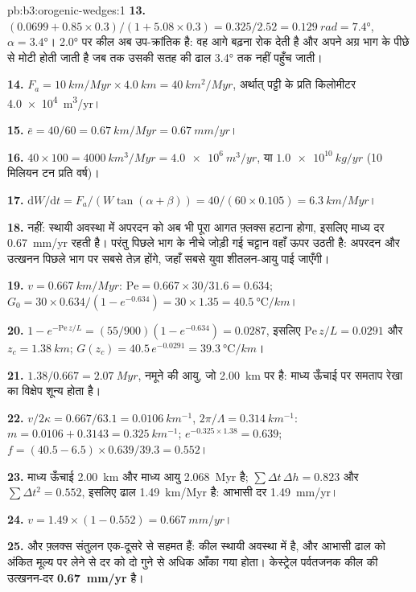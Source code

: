 \begin{solution}{pb:b3:orogenic-wedges:1}
\textbf{13.} $(0.0699 + 0.85\times0.3)/(1 + 5.08\times0.3) = 0.325/2.52 =
\qty{0.129}{rad} = \ang{7.4}$, $\alpha = \ang{3.4}$। \ang{2.0} पर कील
अब उप-क्रांतिक है: वह आगे बढ़ना रोक देती है और अपने अग्र भाग के पीछे
 से मोटी होती जाती है जब तक उसकी सतह की ढाल \ang{3.4} तक नहीं पहुँच जाती।

\textbf{14.} $F_a = \qty{10}{km/Myr}\times\qty{4.0}{km} = \qty{40}{km^2/Myr}$,
अर्थात् पट्टी के प्रति किलोमीटर \qty{4.0e4}{m^3/yr}।

\textbf{15.} $\bar e = 40/60 = \qty{0.67}{km/Myr} = \qty{0.67}{mm/yr}$।

\textbf{16.} $40\times100 = \qty{4000}{km^3/Myr} = \qty{4.0e6}{m^3/yr}$, या
$\qty{1.0e10}{kg/yr}$ (10 मिलियन टन प्रति वर्ष)।

\textbf{17.} $\mathrm dW/\mathrm dt = F_a/(W\tan(\alpha + \beta)) =
40/(60\times0.105) = \qty{6.3}{km/Myr}$।

\textbf{18.} नहीं: स्थायी अवस्था में अपरदन को अब भी पूरा आगत फ़्लक्स
हटाना होगा, इसलिए माध्य दर \qty{0.67}{mm/yr} रहती है। परंतु पिछले भाग के नीचे
जोड़ी गई चट्टान वहाँ ऊपर उठती है: अपरदन और उत्खनन पिछले भाग पर सबसे तेज़ होंगे,
जहाँ सबसे युवा शीतलन-आयु पाई जाएँगी।

\textbf{19.} $v = \qty{0.667}{km/Myr}$: $\mathrm{Pe} = 0.667\times30/31.6 =
0.634$; $G_0 = 30\times0.634/(1 - e^{-0.634}) = 30\times1.35 =
\qty{40.5}{\celsius/km}$।

\textbf{20.} $1 - e^{-\mathrm{Pe}\,z/L} = (55/900)(1 - e^{-0.634}) = 0.0287$,
इसलिए $\mathrm{Pe}\,z/L = 0.0291$ और $z_c = \qty{1.38}{km}$; $G(z_c) =
40.5\,e^{-0.0291} = \qty{39.3}{\celsius/km}$।

\textbf{21.} $1.38/0.667 = \qty{2.07}{Myr}$, नमूने की आयु, जो
\qty{2.00}{km} पर है: माध्य ऊँचाई पर समताप रेखा का विक्षेप शून्य होता है।

\textbf{22.} $v/2\kappa = 0.667/63.1 = \qty{0.0106}{km^{-1}}$, $2\pi/\Lambda =
\qty{0.314}{km^{-1}}$: $m = 0.0106 + 0.3143 = \qty{0.325}{km^{-1}}$;
$e^{-0.325\times1.38} = 0.639$; $f = (40.5 - 6.5)\times0.639/39.3 = 0.552$।

\textbf{23.} माध्य ऊँचाई \qty{2.00}{km} और माध्य आयु
\qty{2.068}{Myr} है; $\sum\Delta t\,\Delta h = 0.823$ और $\sum\Delta t^2 =
0.552$, इसलिए ढाल \qty{1.49}{km/Myr} है: आभासी दर
\qty{1.49}{mm/yr}।

\textbf{24.} $v = 1.49\times(1 - 0.552) = \qty{0.667}{mm/yr}$।

\textbf{25.}  और फ़्लक्स संतुलन एक-दूसरे से सहमत हैं: कील
स्थायी अवस्था में है, और आभासी ढाल को अंकित मूल्य पर लेने से दर को
दो गुने से अधिक आँका गया होता। केस्ट्रेल पर्वतजनक कील की उत्खनन-दर
\textbf{\qty[text-series-to-math=true]{0.67}{mm/yr}} है।
\end{solution}
